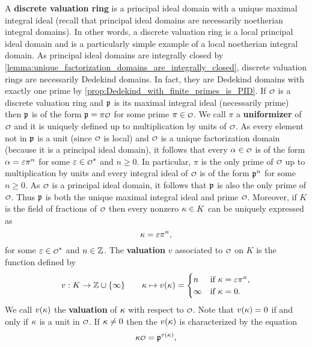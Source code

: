     A \textbf{discrete valuation ring} is a principal ideal domain with a unique maximal integral ideal (recall that principal ideal domains are necessarily noetherian integral domains). In other words, a discrete valuation ring is a local principal ideal domain and is a particularly simple example of a local noetherian integral domain. As principal ideal domains are integrally closed by \cref{lemma:unique_factorization_domains_are_integrally_closed}, discrete valuation rings are necessarily Dedekind domains. In fact, they are Dedekind domains with exactly one prime by \cref{prop:Dedekind_with_finite_primes_is_PID}. If $\smc{O}$ is a discrete valuation ring and $\mathfrak{p}$ is its maximal integral ideal (necessarily prime) then $\mathfrak{p}$ is of the form $\mf{p} = \pi\smc{O}$ for some prime $\pi \in \smc{O}$. We call $\pi$ a \textbf{uniformizer} of $\smc{O}$ and it is uniquely defined up to multiplication by units of $\smc{O}$. As every element not in $\mathfrak{p}$ is a unit (since $\smc{O}$ is local) and $\smc{O}$ is a unique factorization domain (because it is a principal ideal domain), it follows that every $\a \in \smc{O}$ is of the form $\alpha = \varepsilon\pi^{n}$ for some $\e \in \smc{O}^{\ast}$ and $n \ge 0$. In particular, $\pi$ is the only prime of $\smc{O}$ up to multiplication by units and every integral ideal of $\smc{O}$ is of the form $\mathfrak{p}^{n}$ for some $n \ge 0$. As $\smc{O}$ is a principal ideal domain, it follows that $\mathfrak{p}$ is also the only prime of $\smc{O}$. Thus $\mathfrak{p}$ is both the unique maximal integral ideal and prime $\smc{O}$. Moreover, if $K$ is the field of fractions of $\smc{O}$ then every nonzero $\kappa \in K$ can be uniquely expressed as
    \[
      \kappa = \varepsilon\pi^{n},
    \]
    for some $\e \in \smc{O}^{\ast}$ and $n \in \mathbb{Z}$. The \textbf{valuation} $v$ associated to $\smc{O}$ on $K$ is the function defined by
    \[
      v:K \to \mathbb{Z} \cup \{\infty\} \qquad \kappa \mapsto v(\kappa) = \begin{cases} n & \text{if $\kappa = \varepsilon\pi^{n}$}, \\ \infty & \text{if $\kappa = 0$}. \end{cases}
    \]
    We call $v(\kappa)$ the \textbf{valuation} of $\kappa$ with respect to $\smc{O}$. Note that $v(\kappa) = 0$ if and only if $\kappa$ is a unit in $\smc{O}$. If $\kappa \neq 0$ then the $v(\kappa)$ is characterized by the equation
    \begin{equation}\label{equ:valuation_characterization}
      \k\smc{O} = \mf{p}^{v(\k)},
    \end{equation}
